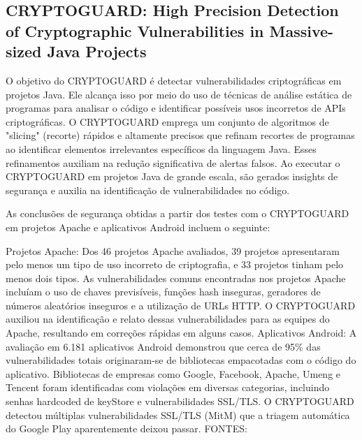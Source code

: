 

\subsection{CRYPTOGUARD: High Precision Detection of Cryptographic Vulnerabilities in Massive-sized Java Projects}

O objetivo do CRYPTOGUARD é detectar vulnerabilidades criptográficas em projetos Java. Ele alcança isso por meio do uso de técnicas de análise estática de programas para analisar o código e identificar possíveis usos incorretos de APIs criptográficas. O CRYPTOGUARD emprega um conjunto de algoritmos de "slicing" (recorte) rápidos e altamente precisos que refinam recortes de programas ao identificar elementos irrelevantes específicos da linguagem Java. Esses refinamentos auxiliam na redução significativa de alertas falsos. Ao executar o CRYPTOGUARD em projetos Java de grande escala, são gerados insights de segurança e auxilia na identificação de vulnerabilidades no código.



As conclusões de segurança obtidas a partir dos testes com o CRYPTOGUARD em projetos Apache e aplicativos Android incluem o seguinte:

Projetos Apache:
Dos 46 projetos Apache avaliados, 39 projetos apresentaram pelo menos um tipo de uso incorreto de criptografia, e 33 projetos tinham pelo menos dois tipos.
As vulnerabilidades comuns encontradas nos projetos Apache incluíam o uso de chaves previsíveis, funções hash inseguras, geradores de números aleatórios inseguros e a utilização de URLs HTTP.
O CRYPTOGUARD auxiliou na identificação e relato dessas vulnerabilidades para as equipes do Apache, resultando em correções rápidas em alguns casos.
Aplicativos Android:
A avaliação em 6.181 aplicativos Android demonstrou que cerca de 95\% das vulnerabilidades totais originaram-se de bibliotecas empacotadas com o código do aplicativo.
Bibliotecas de empresas como Google, Facebook, Apache, Umeng e Tencent foram identificadas com violações em diversas categorias, incluindo senhas hardcoded de keyStore e vulnerabilidades SSL/TLS.
O CRYPTOGUARD detectou múltiplas vulnerabilidades SSL/TLS (MitM) que a triagem automática do Google Play aparentemente deixou passar.
FONTES:

